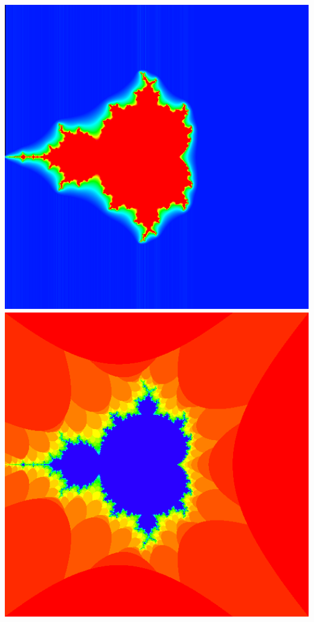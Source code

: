 \documentclass[../r.tex]{subfiles}
\begin{document}
\includegraphics[scale=0.15]{../TAing/mandel/11.png}
\includegraphics[scale=0.15]{../TAing/mandel/brot.png}
\end{document}
